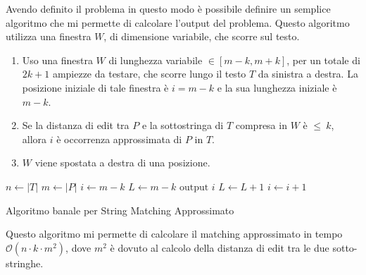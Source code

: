 Avendo definito il problema in questo modo è possibile definire un semplice
algoritmo che mi permette di calcolare l'output del problema. Questo algoritmo
utilizza una finestra $W$, di dimensione variabile, che scorre sul testo.
\begin{enumerate}
    \item Uso una finestra $W$ di lunghezza variabile $\in [m - k, m + k]$, per
          un totale di $2k+1$ ampiezze da testare, che scorre lungo il testo $T$ da
          sinistra a destra. La posizione iniziale di tale finestra è $i = m - k$ e
          la sua lunghezza iniziale è $m - k$.
    \item Se la distanza di edit tra $P$ e la sottostringa di $T$ compresa in $W$
          è $\leq \ k$, allora $i$ è occorrenza approssimata di $P$ in $T$.
    \item $W$ viene spostata a destra di una posizione.
\end{enumerate}
\begin{algorithm}
    \begin{algorithmic}
        \State $n\gets |T|$
        \State $m \gets |P|$
        \State $i\gets m - k$
        \State $L \gets  m - k$
        \State $\text{output } i$
        \EndIf
        \State $L \gets L + 1$
        \EndWhile
        \State $i \gets i + 1$
        \EndWhile
        \EndFunction
    \end{algorithmic}
    \caption{Algoritmo banale per String Matching Approssimato}
\end{algorithm}
Questo algoritmo mi permette di calcolare il matching approssimato in tempo
$\mathcal{O}(n \cdot k \cdot m^2)$, dove $m^2$ è dovuto al calcolo della distanza
di edit tra le due sotto-stringhe.
